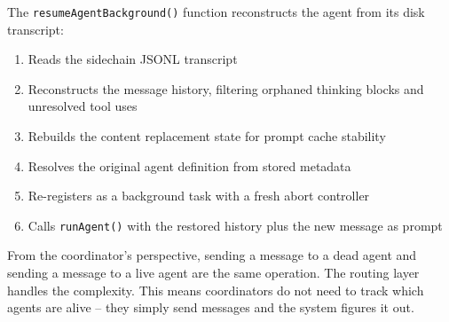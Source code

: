 \documentclass[
  english,
  11pt,
  letterpaper,
]{book}
\newenvironment{Shaded}{\begin{snugshade}}{\end{snugshade}}
\newcommand{\AttributeTok}[1]{\textcolor[rgb]{0.40,0.45,0.13}{#1}}
\newcommand{\ControlFlowTok}[1]{\textcolor[rgb]{0.00,0.23,0.31}{\textbf{#1}}}
\newcommand{\FunctionTok}[1]{\textcolor[rgb]{0.28,0.35,0.67}{#1}}
\newcommand{\KeywordTok}[1]{\textcolor[rgb]{0.00,0.23,0.31}{\textbf{#1}}}
\newcommand{\NormalTok}[1]{\textcolor[rgb]{0.00,0.23,0.31}{#1}}
\newcommand{\OperatorTok}[1]{\textcolor[rgb]{0.37,0.37,0.37}{#1}}
\newcommand{\SpecialCharTok}[1]{\textcolor[rgb]{0.37,0.37,0.37}{#1}}
\newcommand{\StringTok}[1]{\textcolor[rgb]{0.13,0.47,0.30}{#1}}
\newcommand{\VerbatimStringTok}[1]{\textcolor[rgb]{0.13,0.47,0.30}{#1}}
\providecommand{\tightlist}{%
  \setlength{\itemsep}{0pt}\setlength{\parskip}{0pt}}
\begin{document}
\begin{Shaded}
\end{Shaded}

The \texttt{resumeAgentBackground()} function reconstructs the agent
from its disk transcript:

\begin{enumerate}
\def\labelenumi{\arabic{enumi}.}
\tightlist
\item
  Reads the sidechain JSONL transcript
\item
  Reconstructs the message history, filtering orphaned thinking blocks
  and unresolved tool uses
\item
  Rebuilds the content replacement state for prompt cache stability
\item
  Resolves the original agent definition from stored metadata
\item
  Re-registers as a background task with a fresh abort controller
\item
  Calls \texttt{runAgent()} with the restored history plus the new
  message as prompt
\end{enumerate}

From the coordinator's perspective, sending a message to a dead agent
and sending a message to a live agent are the same operation. The
routing layer handles the complexity. This means coordinators do not
need to track which agents are alive -- they simply send messages and
the system figures it out.
\end{document}

